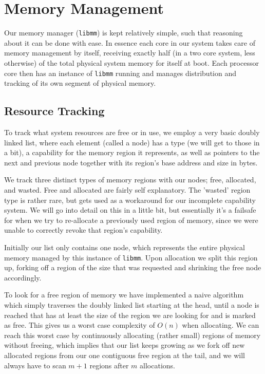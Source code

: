 \section{Memory Management}\label{s:memory-management}

Our memory manager (\texttt{libmm}) is kept relatively simple, such that 
reasoning about it can be done with ease. In essence each core in our system 
takes care of memory management by itself, receiving exactly half (in a two 
core system, less otherwise) of the total physical system memory for itself at 
boot. Each processor core then has an instance of \texttt{libmm} running and 
manages distribution and tracking of its own segment of physical memory.

\subsection{Resource Tracking}\label{ss:res-tracking}

To track what system resources are free or in use, we employ a very basic 
doubly linked list, where each element (called a node) has a type (we will get 
to those in a bit), a capability for the memory region it represents, as well 
as pointers to the next and previous node together with its region's base 
address and size in bytes.
\medskip

We track three distinct types of memory regions with our nodes; free, 
allocated, and wasted. Free and allocated are fairly self explanatory. The 
'wasted' region type is rather rare, but gets used as a workaround for our 
incomplete capability system. We will go into detail on this in a little bit, 
but essentially it's a failsafe for when we try to re-allocate a previously 
used region of memory, since we were unable to correctly revoke that region's 
capability.	
\medskip

Initially our list only contains one node, which represents the entire physical 
memory managed by this instance of \texttt{libmm}. Upon allocation we split 
this region up, forking off a region of the size that was requested and 
shrinking the free node accordingly.
\medskip

To look for a free region of memory we have implemented a naive algorithm which 
simply traverses the doubly linked list starting at the head, until a node is 
reached that has at least the size of the region we are looking for and is 
marked as free. This gives us a worst case complexity of $O(n)$ when 
allocating. We can reach this worst case by continuously allocating (rather 
small) regions of memory without freeing, which implies that our list keeps 
growing as we fork off new allocated regions from our one contiguous free 
region at the tail, and we will always have to scan $m + 1$ regions after $m$ 
allocations.
\medskip

